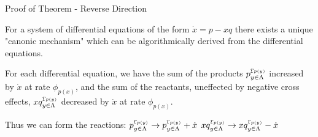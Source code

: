 \begin{frame}{Proof of Theorem - Reverse Direction}
    
		For a system of differential equations of the form \(\dot x = p - xq\) there exists a unique "canonic mechanism" which can be algorithmically derived from the differential equations.\newline
        
        For each differential equation, we have the sum of the products \(p_{y \in \Lambda}^{\underaccent{\tilde}{r}_{p(y)}}\) increased by \(\dot x\) at rate \(\phi_{p(x)}\), and the sum of the reactants, uneffected by negative cross effects, \(xq_{y \in \Lambda}^{\underaccent{\tilde}{r}_{p(y)}}\) decreased by \(\dot x\) at rate \(\phi_{p(x)}\).\newline
        
        Thus we can form the reactions:\newline \newline
        \(p_{y \in \Lambda}^{\underaccent{\tilde}{r}_{p(y)}} \to p_{y \in \Lambda}^{\underaccent{\tilde}{r}_{p(y)}} + \dot x\) \newline \newline
        \(xq_{y \in \Lambda}^{\underaccent{\tilde}{r}_{p(y)}} \to xq_{y \in \Lambda}^{\underaccent{\tilde}{r}_{p(y)}} - \dot x\)
    
\end{frame}
